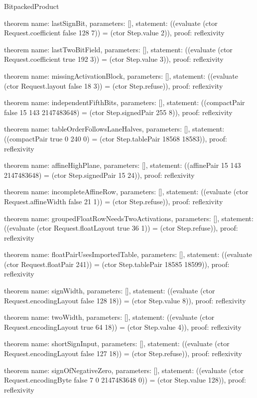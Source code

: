 \begin{lexlean}{BitpackedProduct}
\begin{semanticmodule}
theorem{
  name: lastSignBit,
  parameters: [],
  statement: ((evaluate (ctor Request.coefficient false 128 7)) = (ctor Step.value 2)),
  proof: reflexivity{}
}

theorem{
  name: lastTwoBitField,
  parameters: [],
  statement: ((evaluate (ctor Request.coefficient true 192 3)) = (ctor Step.value 3)),
  proof: reflexivity{}
}

theorem{
  name: missingActivationBlock,
  parameters: [],
  statement: ((evaluate (ctor Request.layout false 18 3)) = (ctor Step.refuse)),
  proof: reflexivity{}
}

theorem{
  name: independentFifthBits,
  parameters: [],
  statement: ((compactPair false 15 143 2147483648) = (ctor Step.signedPair 255 8)),
  proof: reflexivity{}
}

theorem{
  name: tableOrderFollowsLaneHalves,
  parameters: [],
  statement: ((compactPair true 0 240 0) = (ctor Step.tablePair 18568 18583)),
  proof: reflexivity{}
}

theorem{
  name: affineHighPlane,
  parameters: [],
  statement: ((affinePair 15 143 2147483648) = (ctor Step.signedPair 15 24)),
  proof: reflexivity{}
}

theorem{
  name: incompleteAffineRow,
  parameters: [],
  statement: ((evaluate (ctor Request.affineWidth false 21 1)) = (ctor Step.refuse)),
  proof: reflexivity{}
}

theorem{
  name: groupedFloatRowNeedsTwoActivations,
  parameters: [],
  statement: ((evaluate (ctor Request.floatLayout true 36 1)) = (ctor Step.refuse)),
  proof: reflexivity{}
}

theorem{
  name: floatPairUsesImportedTable,
  parameters: [],
  statement: ((evaluate (ctor Request.floatPair 241)) = (ctor Step.tablePair 18585 18599)),
  proof: reflexivity{}
}

theorem{
  name: signWidth,
  parameters: [],
  statement: ((evaluate (ctor Request.encodingLayout false 128 18)) = (ctor Step.value 8)),
  proof: reflexivity{}
}

theorem{
  name: twoWidth,
  parameters: [],
  statement: ((evaluate (ctor Request.encodingLayout true 64 18)) = (ctor Step.value 4)),
  proof: reflexivity{}
}

theorem{
  name: shortSignInput,
  parameters: [],
  statement: ((evaluate (ctor Request.encodingLayout false 127 18)) = (ctor Step.refuse)),
  proof: reflexivity{}
}

theorem{
  name: signOfNegativeZero,
  parameters: [],
  statement: ((evaluate (ctor Request.encodingByte false 7 0 2147483648 0)) = (ctor Step.value 128)),
  proof: reflexivity{}
}


\end{semanticmodule}
\end{lexlean}
